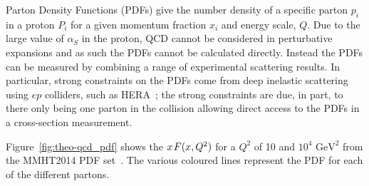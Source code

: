 Parton Density Functions (PDFs) give the number density of a specific parton $p_i$ in a proton $P_i$
for a given momentum fraction $x_i$ and energy scale, $Q$.
Due to the large value of $\alpha_S$ in the proton, QCD cannot be considered in perturbative expansions and as such the PDFs cannot be calculated directly.
Instead the PDFs can be measured by combining a range of experimental scattering results.
In particular, strong constraints on the PDFs come from deep inelastic scattering using $ep$ colliders, such as HERA~\cite{theo-qcd_hera};
the strong constraints are due, in part, to there only being one parton in the collision allowing direct access to the PDFs in a cross-section measurement.


Figure~\ref{fig:theo-qcd_pdf} shows the $x\hspace{0.3mm}F(x,Q^2)$ for a $Q^2$ of 10 and $10^4$ $\text{GeV}^2$
from the MMHT2014 PDF set~\cite{theo-qcd_pdf}.
The various coloured lines represent the PDF for each of the different partons.

